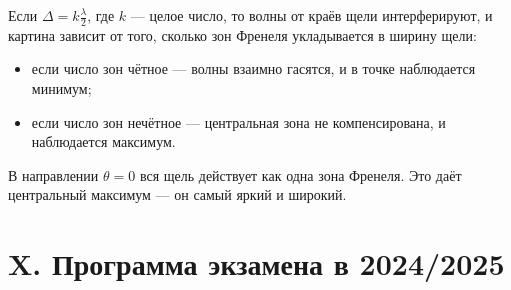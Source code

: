 \documentclass[12pt]{article}
\begin{document}
Если $\Delta = k\frac{\lambda}{2}$, где $k$ — целое число, то волны от краёв щели интерферируют, и картина зависит от того, сколько зон Френеля укладывается в ширину щели:
\begin{itemize}
  \item если число зон чётное — волны взаимно гасятся, и в точке наблюдается минимум;
  \item если число зон нечётное — центральная зона не компенсирована, и наблюдается максимум.
\end{itemize}

В направлении $\theta = 0$ вся щель действует как одна зона Френеля. Это даёт центральный максимум — он самый яркий и широкий.


\clearpage

\section{X. Программа экзамена в 2024/2025}
\end{document}
